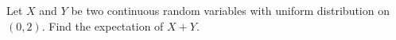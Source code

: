 












\begin{problem}%
    Let $X$ and $Y$ be two continuous random variables with uniform distribution on $(0,2)$. Find the expectation of $X+Y$.
\end{problem}

